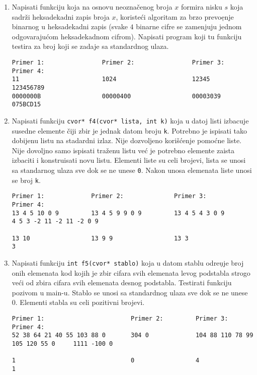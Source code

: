 \begin{enumerate}
\item
  Napisati funkciju koja na osnovu neozna\v cenog broja $x$ formira
  nisku $s$ koja sadr\v zi heksadekadni zapis broja $x$, koriste\' ci
  algoritam za brzo prevo\d enje binarnog u heksadekadni zapis (svake
  $4$ binarne cifre se zamenjuju jednom odgovaraju\' com heksadekadnom
  cifrom).  Napisati program koji tu funkciju testira za broj koji se
  zadaje sa standardnog ulaza.
\begin{verbatim}
Primer 1:                Primer 2:                Primer 3:                Primer 4:
11                       1024                     12345                    123456789
0000000B                 00000400                 00003039                 075BCD15
\end{verbatim}

\item
Napisati funkciju {\tt cvor* f4(cvor* lista, int k)} koja u datoj
listi izbacuje susedne elemente \v ciji zbir je jednak datom broju
{\tt k}. Potrebno je ispisati tako dobijenu listu na stadardni
izlaz. Nije dozvoljeno kori\v s\'cenje pomo\'cne liste. Nije dovoljno
samo ispisati tra\v zenu listu ve\' c je potrebno elemente zaista
izbaciti i konstruisati novu listu. Elementi liste su celi brojevi,
lista se unosi sa standarnog ulaza sve dok se ne unese {\tt 0}. Nakon
unosa elemenata liste unosi se broj {\tt k}.
\begin{verbatim}
Primer 1:             Primer 2:              Primer 3:              Primer 4:
13 4 5 10 0 9         13 4 5 9 9 0 9         13 4 5 4 3 0 9         4 5 3 -2 11 -2 11 -2 0 9

13 10                 13 9 9                 13 3                   3 
\end{verbatim}

\item
Napisati funkciju {\tt int f5(cvor* stablo)} koja u datom stablu
odre\d uje broj onih elemenata kod kojih je zbir cifara svih elemenata
levog podstabla strogo ve\'ci od zbira cifara svih elemenata desnog
podstabla. Testirati funkciju pozivom u main-u. Stablo se unosi sa
standardnog ulaza sve dok se ne unese 0. Elementi stabla su celi
pozitivni brojevi.
\begin{verbatim}
Primer 1:                        Primer 2:         Primer 3:                         Primer 4:
52 38 64 21 40 55 103 88 0       304 0             104 88 110 78 99 105 120 55 0     1111 -100 0

1                                0                 4                                 1
\end{verbatim}
\end{enumerate}
